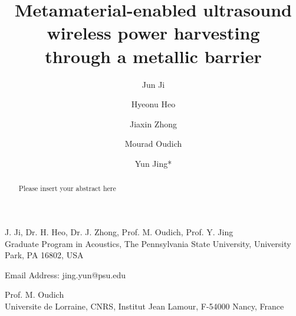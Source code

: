 \documentclass{WileyMSP-template}
\begin{document}
\pagestyle{fancy}


\title{Metamaterial-enabled ultrasound wireless power harvesting\\ through a metallic barrier }

\maketitle



\author{Jun Ji}
\author{Hyeonu Heo}
\author{Jiaxin Zhong}
\author{Mourad Oudich}%
\author{Yun Jing*}


\begin{affiliations}
J. Ji, Dr. H. Heo, Dr. J. Zhong, Prof. M. Oudich, Prof. Y. Jing \\

Graduate Program in Acoustics, The Pennsylvania State University, University Park, PA 16802, USA

Email Address: jing.yun@psu.edu

Prof. M. Oudich \\
Universite de Lorraine, CNRS, Institut Jean Lamour, F-54000 Nancy, France



\end{affiliations}






\begin{abstract}

Please insert your abstract here

\end{abstract}
\end{document}
